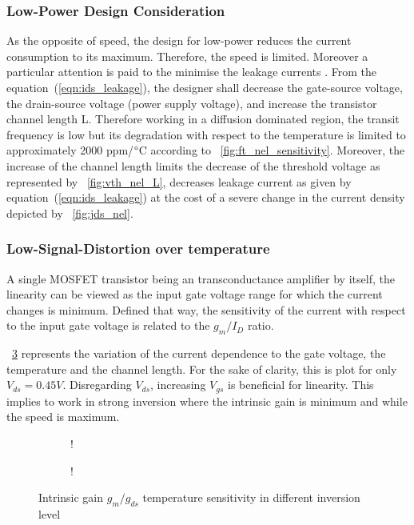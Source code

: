\subsubsection{Low-Power Design Consideration}
As the opposite of speed, the design for low-power reduces the current consumption to its maximum. Therefore, the speed is limited. Moreover a particular attention is paid to the minimise the leakage currents%
. From the equation~(\ref{eqn:ids_leakage}), the designer shall decrease the gate-source voltage, the drain-source voltage (power supply voltage), and increase the transistor channel length L. Therefore working in a diffusion dominated region, the transit frequency is low but its degradation with respect to the temperature is limited to approximately 2000 ppm/\(\degree \)C according to \figurename~\ref{fig:ft_nel_sensitivity}. Moreover, the increase of the channel length limits the decrease of the threshold voltage as represented by \figurename~\ref{fig:vth_nel_L}, decreases leakage current as given by equation~(\ref{eqn:ids_leakage}) at the cost of a severe change in the current density depicted by \figurename~\ref{fig:jds_nel}.

\subsubsection{Low-Signal-Distortion over temperature}
A single MOSFET transistor being an transconductance amplifier by itself, the linearity can be viewed as the input gate voltage range for which the current changes is minimum. Defined that way, the sensitivity of the current with respect to the input gate voltage is related to the \(g_m/I_D \) ratio.

\figurename~\ref{fig:gm_id} represents the variation of the current dependence to the gate voltage, the temperature and the channel length. For the sake of clarity, this is plot for only \(V_{ds} = 0.45 V\). Disregarding \(V_{ds}\), increasing \(V_{gs}\) is beneficial for linearity. This implies to work in strong inversion where the intrinsic gain is minimum and while the speed is maximum. 

\begin{figure}[!ht]
    \centering
    \begin{subfigure}[b]{0.48\textwidth}
        \resizebox {\textwidth} {!} { 
            
        }
        \label{fig:gm_nel_T}
    \end{subfigure}
    \begin{subfigure}[b]{0.48\textwidth}
        \resizebox {\textwidth} {!} { 
            
        }
        \label{fig:gm_nel_L}
    \end{subfigure}
    \caption{Intrinsic gain \(g_m/g_{ds} \) temperature sensitivity in different inversion level}
    \label{fig:gm_id}
\end{figure}


